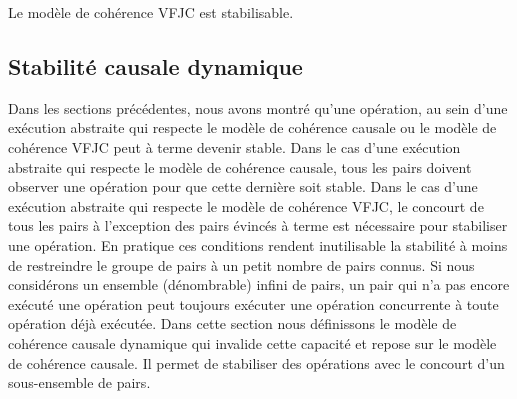 


\begin{theorem}\label{th:stabilizable-vfjc}
Le modèle de cohérence \ac{VFJC} est stabilisable.
\end{theorem}

\subsection{Stabilité causale dynamique}\label{subsec:dcs}

Dans les sections précédentes, nous avons montré qu'une opération, au sein d'une exécution abstraite qui respecte le modèle de cohérence causale ou le modèle de cohérence \ac{VFJC} peut à terme devenir stable.
Dans le cas d'une exécution abstraite qui respecte le modèle de cohérence causale, tous les pairs doivent observer une opération pour que cette dernière soit stable.
Dans le cas d'une exécution abstraite qui respecte le modèle de cohérence \ac{VFJC}, le concourt de tous les pairs à l'exception des pairs évincés à terme est nécessaire pour stabiliser une opération.
En pratique ces conditions rendent inutilisable la stabilité à moins de restreindre le groupe de pairs à un petit nombre de pairs connus.
Si nous considérons un ensemble (dénombrable) infini de pairs, un pair qui n'a pas encore exécuté une opération peut toujours exécuter une opération concurrente à toute opération déjà exécutée.
Dans cette section nous définissons le modèle de cohérence causale dynamique qui invalide cette capacité et repose sur le modèle de cohérence causale.
Il permet de stabiliser des opérations avec le concourt d'un sous-ensemble de pairs.

